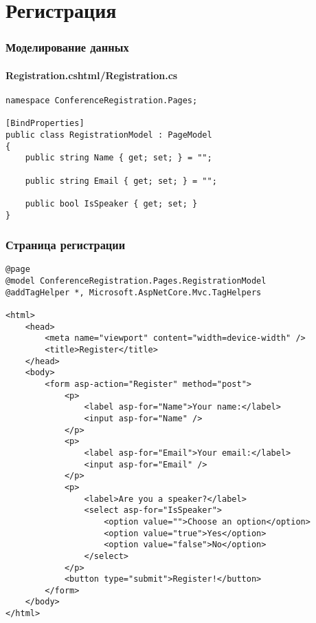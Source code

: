 \documentclass{../../slides-style}
\begin{document}
    \section{Регистрация}

    \begin{frame}[fragile]
        \frametitle{Моделирование данных}
        \framesubtitle{Registration.cshtml/Registration.cs}
        \begin{verbatim}
namespace ConferenceRegistration.Pages;

[BindProperties]
public class RegistrationModel : PageModel
{
    public string Name { get; set; } = "";

    public string Email { get; set; } = "";

    public bool IsSpeaker { get; set; }
}
        \end{verbatim}
    \end{frame}

    \begin{frame}[fragile]
        \frametitle{Страница регистрации}
        \begin{ssmall}
            \begin{verbatim}
@page
@model ConferenceRegistration.Pages.RegistrationModel
@addTagHelper *, Microsoft.AspNetCore.Mvc.TagHelpers

<html>
    <head>
        <meta name="viewport" content="width=device-width" />
        <title>Register</title>
    </head>
    <body>
        <form asp-action="Register" method="post">
            <p>
                <label asp-for="Name">Your name:</label>
                <input asp-for="Name" />
            </p>
            <p>
                <label asp-for="Email">Your email:</label>
                <input asp-for="Email" />
            </p>
            <p>
                <label>Are you a speaker?</label>
                <select asp-for="IsSpeaker">
                    <option value="">Choose an option</option>
                    <option value="true">Yes</option>
                    <option value="false">No</option>
                </select>
            </p>
            <button type="submit">Register!</button>
        </form>
    </body>
</html>
            \end{verbatim}
        \end{ssmall}
    \end{frame}
\end{document}
